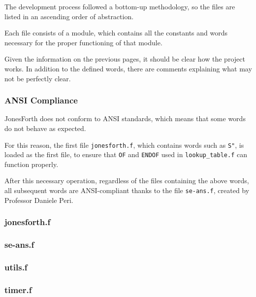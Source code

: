 \documentclass[a4paper, 12pt]{article}
\begin{document}
The development process followed a bottom-up methodology, so the files are listed in an ascending order of abstraction.

Each file consists of a module, which contains all the constants and words necessary for the proper functioning of that module.

Given the information on the previous pages, it should be clear how the project works. In addition to the defined words, there are comments explaining what may not be perfectly clear.

\subsubsection{ANSI Compliance}
JonesForth does not conform to ANSI\cite{ANSICompliance} standards, which means that some words do not behave as expected.

For this reason, the first file \texttt{jonesforth.f}, which contains words such as \texttt{S"}, is loaded as the first file, to ensure that \texttt{OF} and \texttt{ENDOF} used in \texttt{lookup\_table.f} can function properly.

After this necessary operation, regardless of the files containing the above words, all subsequent words are ANSI-compliant thanks to the file \texttt{se-ans.f}, created by Professor Daniele Peri.

\subsubsection{jonesforth.f}

\subsubsection{se-ans.f}

\subsubsection{utils.f}

\subsubsection{timer.f}
\end{document}
